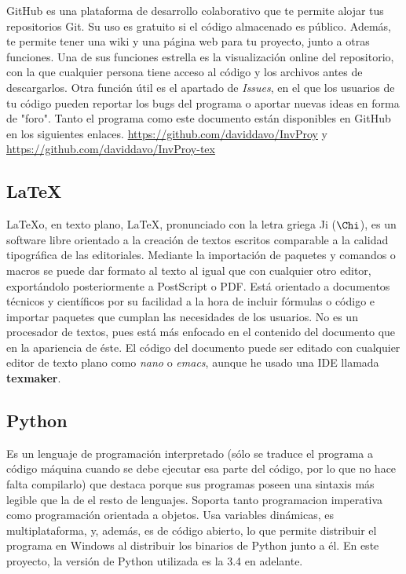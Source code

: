 \documentclass[a4paper, 11pt]{report} %
\begin{document}
GitHub es una plataforma de desarrollo colaborativo que te permite alojar tus repositorios Git. Su uso es gratuito si el código almacenado es público. Además, te permite tener una wiki y una página web para tu proyecto, junto a otras funciones.
Una de sus funciones estrella es la visualización online del repositorio, con la que cualquier persona tiene acceso al código y los archivos antes de descargarlos. Otra función útil es el apartado de \textit{Issues}, en el que los usuarios de tu código pueden reportar los bugs del programa o aportar nuevas ideas en forma de "foro".
Tanto el programa como este documento están disponibles en GitHub en los siguientes enlaces. \url{https://github.com/daviddavo/InvProy} y \url{https://github.com/daviddavo/InvProy-tex}

\subsection{LaTeX}
\LaTeX\space o, en texto plano, LaTeX, pronunciado con la letra griega 
Ji ($\Chi$), es un software libre orientado a la creación de textos escritos comparable a la calidad tipográfica de las editoriales. Mediante la importación de paquetes y comandos o macros se puede dar formato al texto al igual que con cualquier otro editor, exportándolo posteriormente a PostScript o PDF. Está orientado a documentos técnicos y científicos por su facilidad a la hora de incluir fórmulas o código e importar paquetes que cumplan las necesidades de los usuarios. No es un procesador de textos, pues está más enfocado en el contenido del documento que en la apariencia de éste.
El código del documento puede ser editado con cualquier editor de texto plano como \textit{nano} o \textit{emacs}, aunque he usado una \acrshort{IDE} llamada \textbf{texmaker}.

\subsection{Python}
Es un lenguaje de programación interpretado (sólo se traduce  el programa a código máquina cuando se debe ejecutar esa parte del código, por lo que no hace falta compilarlo) que destaca porque sus programas poseen una sintaxis más legible que la de el resto de lenguajes. Soporta tanto \gls{programacion imperativa} como programación orientada a objetos. Usa variables dinámicas, es multiplataforma, y, además, es de código abierto, lo que permite distribuir el programa en Windows al distribuir los binarios de Python junto a él. En este proyecto, la versión de Python utilizada es la 3.4 en adelante.
\end{document}
